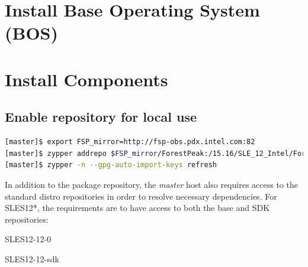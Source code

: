 \documentclass[letterpaper]{article}
\newcommand{\baseOS}{SLES12*}
\begin{document}






\section{Install Base Operating System (BOS)}



\section{Install \FSP{} Components} \label{sec:basic_install}


\subsection{Enable \FSP{} repository for local use}


\begin{lstlisting}[language=bash,keywords={}]
[master]$ export FSP_mirror=http://fsp-obs.pdx.intel.com:82
[master]$ zypper addrepo $FSP_mirror/ForestPeak:/15.16/SLE_12_Intel/ForestPeak:15.16.repo
[master]$ zypper -n --gpg-auto-import-keys refresh
\end{lstlisting}


In addition to the \FSP{} package repository, the {\em master} host also
requires access to the standard distro repositories in order to resolve
necessary dependencies. For \baseOS{}, the requirements are to have access to
both the base and SDK repositories:

\begin{itemize*}
\item SLES12-12-0
\item SLES12-12-sdk
\end{itemize*}

\end{document}
